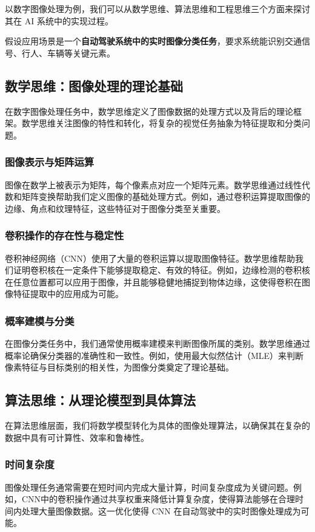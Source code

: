 以数字图像处理为例，我们可以从数学思维、算法思维和工程思维三个方面来探讨其在 AI 系统中的实现过程。

假设应用场景是一个{\bf 自动驾驶系统中的实时图像分类任务}，要求系统能识别交通信号、行人、车辆等关键元素。

\subsection{  数学思维：图像处理的理论基础}

在数字图像处理任务中，数学思维定义了图像数据的处理方式以及背后的理论框架。数学思维关注图像的特性和转化，将复杂的视觉任务抽象为特征提取和分类问题。

\subsubsection*{图像表示与矩阵运算}

图像在数学上被表示为矩阵，每个像素点对应一个矩阵元素。数学思维通过线性代数和矩阵变换帮助我们定义图像的基础处理方式。例如，通过卷积运算提取图像的边缘、角点和纹理特征，这些特征对于图像分类至关重要。

\subsubsection*{卷积操作的存在性与稳定性}
卷积神经网络（CNN）使用了大量的卷积运算以提取图像特征。数学思维帮助我们证明卷积核在一定条件下能够提取稳定、有效的特征。例如，边缘检测的卷积核在任意位置都可以应用于图像，并且能够稳健地捕捉到物体边缘，这使得卷积在图像特征提取中的应用成为可能。

\subsubsection*{概率建模与分类}

在图像分类任务中，我们通常使用概率建模来判断图像所属的类别。数学思维通过概率论确保分类器的准确性和一致性。例如，使用最大似然估计（MLE）来判断像素特征与目标类别的相关性，为图像分类奠定了理论基础。

\subsection{ 算法思维：从理论模型到具体算法}

在算法思维层面，我们将数学模型转化为具体的图像处理算法，以确保其在复杂的数据中具有可计算性、效率和鲁棒性。

\subsubsection*{时间复杂度}
图像处理任务通常需要在短时间内完成大量计算，时间复杂度成为关键问题。例如，CNN中的卷积操作通过共享权重来降低计算复杂度，使得算法能够在合理时间内处理大量图像数据。这一优化使得 CNN 在自动驾驶中的实时图像处理成为可能。


